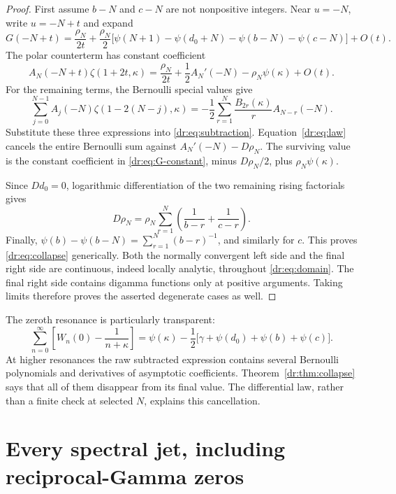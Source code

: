 \documentclass[11pt,letterpaper]{article}
\numberwithin{equation}{section}
\theoremstyle{definition}
\theoremstyle{remark}
\begin{document}
\begin{proof}
First assume $b-N$ and $c-N$ are not nonpositive integers. Near $u=-N$,
write $u=-N+t$ and expand
\begin{equation}
 G(-N+t)=\frac{\rho_N}{2t}
 +\frac{\rho_N}{2}
 \bigl[\psi(N+1)-\psi(d_0+N)-\psi(b-N)-\psi(c-N)\bigr]
 +O(t).
 \label{dr:eq:G-constant}
\end{equation}
The polar counterterm has constant coefficient
\[
 A_N(-N+t)\zeta(1+2t,\kappa)
 =\frac{\rho_N}{2t}+\frac12A_N'(-N)-\rho_N\psi(\kappa)+O(t).
\]
For the remaining terms, the Bernoulli special values give
\[
 \sum_{j=0}^{N-1}A_j(-N)\zeta(1-2(N-j),\kappa)
 =-\frac12\sum_{r=1}^N\frac{B_{2r}(\kappa)}r A_{N-r}(-N).
\]
Substitute these three expressions into \eqref{dr:eq:subtraction}.
Equation~\eqref{dr:eq:law} cancels the entire Bernoulli sum against
$A_N'(-N)-D\rho_N$. The surviving value is the constant coefficient
in \eqref{dr:eq:G-constant}, minus $D\rho_N/2$, plus
$\rho_N\psi(\kappa)$.

Since $D d_0=0$, logarithmic differentiation of the two remaining rising
factorials gives
\[
 D\rho_N=\rho_N\sum_{r=1}^N
           \left(\frac1{b-r}+\frac1{c-r}\right).
\]
Finally,
$\psi(b)-\psi(b-N)=\sum_{r=1}^N(b-r)^{-1}$, and similarly for $c$.
This proves \eqref{dr:eq:collapse} generically. Both the normally
convergent left side and the final right side are continuous, indeed
locally analytic, throughout \eqref{dr:eq:domain}. The final right side
contains digamma functions only at positive arguments. Taking limits
therefore proves the asserted degenerate cases as well.
\end{proof}

The zeroth resonance is particularly transparent:
\begin{equation}
 \sum_{n=0}^{\infty}\left[W_n(0)-\frac1{n+\kappa}\right]
 =\psi(\kappa)-\frac12\bigl[\gamma+\psi(d_0)+\psi(b)+\psi(c)\bigr].
 \label{dr:eq:Nzero}
\end{equation}
At higher resonances the raw subtracted expression contains several
Bernoulli polynomials and derivatives of asymptotic coefficients.
Theorem~\ref{dr:thm:collapse} says that all of them disappear from its
final value. The differential law, rather than a finite check at selected
$N$, explains this cancellation.

\section{Every spectral jet, including reciprocal-Gamma zeros}
\label{dr:sec:jets}
\end{document}
